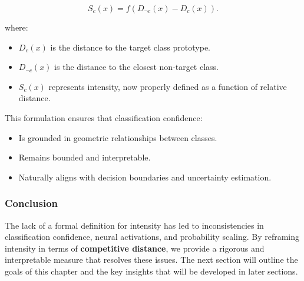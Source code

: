 \[
S_c(x) = f(D_{\neg c}(x) - D_c(x)).
\]

where:

\begin{itemize}
    \item \( D_c(x) \) is the distance to the target class prototype.
    \item \( D_{\neg c}(x) \) is the distance to the closest non-target class.
    \item \( S_c(x) \) represents intensity, now properly defined as a function of relative distance.
\end{itemize}

This formulation ensures that classification confidence:

\begin{itemize}
    \item Is grounded in geometric relationships between classes.
    \item Remains bounded and interpretable.
    \item Naturally aligns with decision boundaries and uncertainty estimation.
\end{itemize}

\subsubsection{Conclusion}

The lack of a formal definition for intensity has led to inconsistencies in classification confidence, neural activations, and probability scaling. By reframing intensity in terms of \textbf{competitive distance}, we provide a rigorous and interpretable measure that resolves these issues. The next section will outline the goals of this chapter and the key insights that will be developed in later sections.
